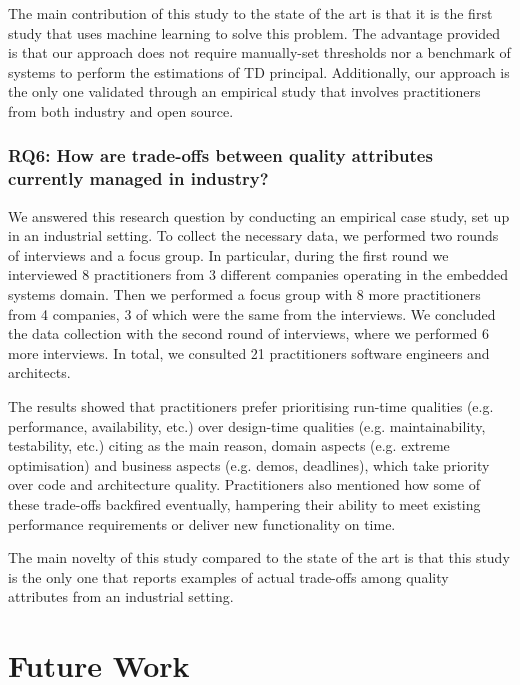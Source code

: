 The main contribution of this study to the state of the art is that it is the first study that uses machine learning to solve this problem.
The advantage provided is that our approach does not require manually-set thresholds nor a benchmark of systems to perform the estimations of TD principal.
Additionally, our approach is the only one validated through an empirical study that involves practitioners from both industry and open source.

\subsubsection*{RQ6: How are trade-offs between quality attributes currently managed in industry?}
We answered this research question by conducting an empirical case study, set up in an industrial setting.
To collect the necessary data, we performed two rounds of interviews and a focus group.
In particular, during the first round we interviewed 8 practitioners from 3 different companies operating in the embedded systems domain.
Then we performed a focus group with 8 more practitioners from 4 companies, 3 of which were the same from the interviews.
We concluded the data collection with the second round of interviews, where we performed 6 more interviews.
In total, we consulted 21 practitioners software engineers and architects.

The results showed that practitioners prefer prioritising run-time qualities (e.g. performance, availability, etc.) over design-time qualities (e.g. maintainability, testability, etc.) citing as the main reason, domain aspects (e.g. extreme optimisation) and business aspects (e.g. demos, deadlines), which take priority over code and architecture quality.
Practitioners also mentioned how some of these trade-offs backfired eventually, hampering their ability to meet existing performance requirements or deliver new functionality on time. 

The main novelty of this study compared to the state of the art is that this study is the only one that reports examples of actual trade-offs among quality attributes from an industrial setting.

\section{Future Work}\label{c8:sec:future-work}



